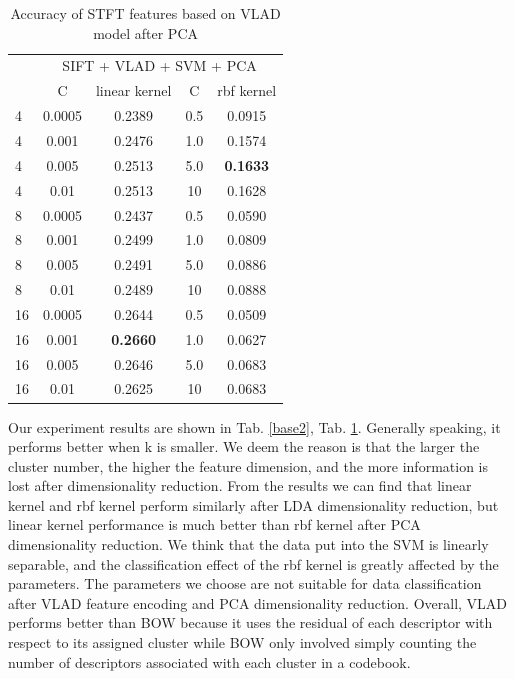 \documentclass[conference]{IEEEtran}
\begin{document}
\begin{table}[htbp]
	\centering
	\newcommand{\tabincell}[2]{\begin{tabular}{@{}#1@{}}#2\end{tabular}}
	\renewcommand\arraystretch{1.0}
	\caption{Accuracy of STFT features based on VLAD model after PCA}
	\label{base3}%
	\begin{tabular}{@{}p{1cm}<{\centering}|c|c|c|c}
		\hline
		\multirow{2}{*}{\diagbox[height=2\line,width=1.42cm,font=\tiny]{$k$}{Acc.}{$\mathit{M}$}} &
		\multicolumn{4}{c}{SIFT + VLAD + SVM + PCA}\\
		\cline{2-5}
		& {C} & {linear kernel} & {C} & {rbf kernel}\\
		\hline
		4   & 0.0005  & 0.2389 & 0.5 & 0.0915\\
		4   & 0.001  & 0.2476 & 1.0 & 0.1574\\
		4   & 0.005  & 0.2513 & 5.0 & \textbf{0.1633}\\
		4   & 0.01  & 0.2513 & 10 & 0.1628\\
		8   & 0.0005 & 0.2437 & 0.5 & 0.0590\\
		8   & 0.001 & 0.2499 & 1.0 & 0.0809\\
		8   & 0.005 & 0.2491 & 5.0 & 0.0886\\
		8   & 0.01  & 0.2489 & 10 & 0.0888\\
		16   & 0.0005  & 0.2644 & 0.5 & 0.0509\\
		16   & 0.001  & \textbf{0.2660} & 1.0 & 0.0627\\
		16   & 0.005  & 0.2646 & 5.0 & 0.0683\\
		16   & 0.01  & 0.2625 & 10 & 0.0683\\
		\hline
	\end{tabular}
\end{table}

Our experiment results are shown in Tab. \ref{base2}, Tab. \ref{base3}. Generally speaking, it performs better when k is smaller. We deem the reason is that the larger the cluster number, the higher the feature dimension, and the more information is lost after dimensionality reduction. From the results we can find that linear kernel and rbf kernel perform similarly after LDA dimensionality reduction, but linear kernel performance is much better than rbf kernel after PCA dimensionality reduction. We think that the data put into the SVM is linearly separable, and the classification effect of the rbf kernel is greatly affected by the parameters. The parameters we choose are not suitable for data classification after VLAD feature encoding and PCA dimensionality reduction. Overall, VLAD performs better than BOW because it uses the residual of each descriptor with respect to its assigned cluster while BOW only involved simply counting the number of descriptors associated with each cluster in a codebook.
\end{document}
